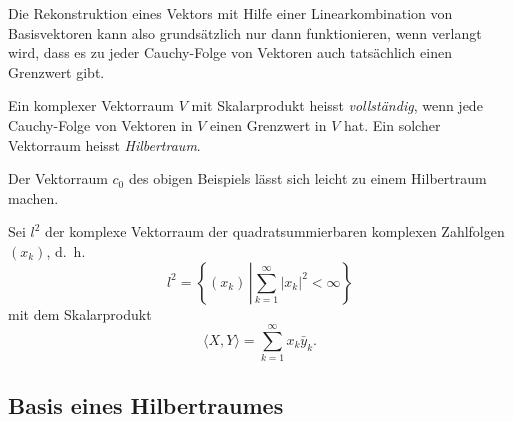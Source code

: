 Die Rekonstruktion eines Vektors mit Hilfe einer Linearkombination von
Basisvektoren kann also grundsätzlich nur dann funktionieren, wenn verlangt
wird, dass es zu jeder Cauchy-Folge von Vektoren auch tatsächlich einen
Grenzwert gibt.

\begin{definition}
Ein komplexer Vektorraum $V$ mit Skalarprodukt heisst {\em vollständig}, 
wenn jede Cauchy-Folge von Vektoren in $V$ einen Grenzwert in $V$ hat.
Ein solcher Vektorraum heisst {\em Hilbertraum}.
\end{definition}

Der Vektorraum $c_0$ des obigen Beispiels lässt sich leicht zu einem
Hilbertraum machen.

\begin{beispiel}
Sei $l^2$ der komplexe Vektorraum der quadratsummierbaren komplexen
Zahlfolgen $(x_k)$, d.~h.
\[
l^2 = \left\{ (x_k)\,\left| \sum_{k=1}^\infty |x_k|^2 < \infty \right.\right\}
\]
mit dem Skalarprodukt
\[
\langle X,Y\rangle = \sum_{k=1}^\infty x_k\bar{y}_k.
\]
\end{beispiel}

\subsection{Basis eines Hilbertraumes}

